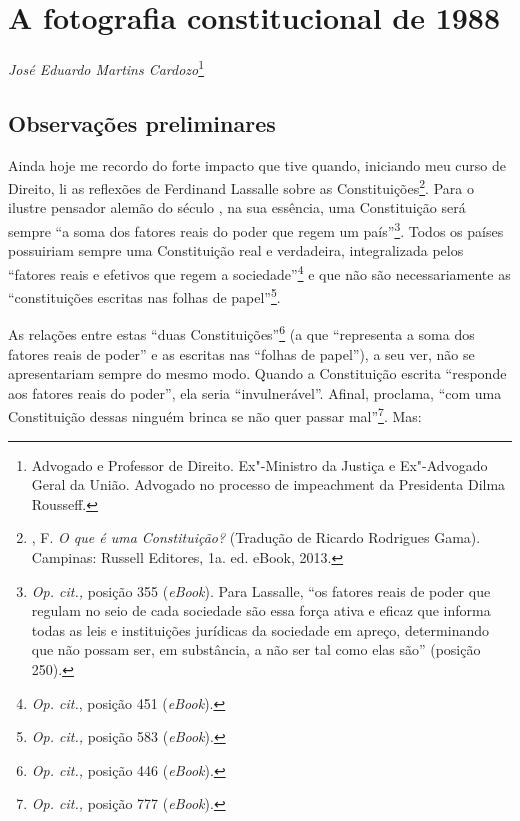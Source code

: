 \chapter*{A fotografia constitucional de 1988}


\begin{flushright}
\emph{José Eduardo Martins Cardozo}\footnote{Advogado e
Professor de Direito. Ex"-Ministro da Justiça e Ex"-Advogado
Geral da União. Advogado no processo de impeachment da Presidenta
Dilma Rousseff.}
\end{flushright}

\section{Observações preliminares}

Ainda hoje me recordo do forte impacto que tive quando, iniciando meu
curso de Direito, li as reflexões de Ferdinand Lassalle sobre as
Constituições\footnote{, F. \emph{O que é uma Constituição?} (Tradução de
  Ricardo Rodrigues Gama). Campinas: Russell Editores, 1a. ed. eBook,
  2013.}. Para o ilustre pensador alemão do século , na sua essência,
uma Constituição será sempre ``a soma dos fatores reais do poder
que regem um país''\footnote{\emph{Op. cit.,} posição 355
  (\emph{eBook}). Para Lassalle, ``os fatores reais de poder que
  regulam no seio de cada sociedade são essa força ativa e eficaz que
  informa todas as leis e instituições jurídicas da sociedade em apreço,
  determinando que não possam ser, em substância, a não ser tal como
  elas são'' (posição 250).}. Todos os países possuiriam sempre uma
Constituição real e verdadeira, integralizada pelos ``fatores
reais e efetivos que regem a sociedade''\footnote{\emph{Op. cit.},
  posição 451 (\emph{eBook}).} e que não são necessariamente as
``constituições escritas nas folhas de papel''\footnote{\emph{Op.
  cit.,} posição 583 (\emph{eBook}).}.

As relações entre estas ``duas Constituições''\footnote{\emph{Op.
  cit.,} posição 446 (\emph{eBook}).} (a que ``representa a soma
dos fatores reais de poder'' e as escritas nas ``folhas de
papel''), a seu ver, não se apresentariam sempre do mesmo modo. Quando
a Constituição escrita ``responde aos fatores reais do poder'',
ela seria ``invulnerável''. Afinal, proclama, ``com uma
Constituição dessas ninguém brinca se não quer passar mal''\footnote{\emph{Op.
  cit.,} posição 777 (\emph{eBook}).}. Mas:

